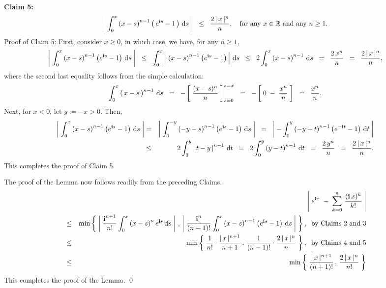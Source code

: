 \vskip 0.5cm
\noindent
\textbf{Claim 5:}
\begin{equation*}
\left\vert\;
\int_{0}^{x}\left(x-s\right)^{n-1}\left(\,e^{\textnormal{\bf i} s} - 1\,\right)\,\textnormal{d} s
\;\right\vert
\;\; \leq \;\; \dfrac{2\,\vert\,x\,\vert^{n}}{n},
\quad
\textnormal{for any $x \in \mathbb{R}$ and any $n \geq 1$.}
\end{equation*}
{\small Proof of Claim 5: First, consider $x \geq 0$, in which case, we have, for any $n \geq 1$,
\begin{equation*}
\left\vert\;
\int_{0}^{x}\left(x-s\right)^{n-1}\left(e^{\textnormal{\bf i} s} - 1\right)\,\textnormal{d} s
\;\right\vert
\;\;\leq\;\;
\int_{0}^{x}
\left\vert\;
\left(x-s\right)^{n-1}\left(e^{\textnormal{\bf i} s} - 1\right)
\,\right\vert
\,\textnormal{d} s
\;\;\leq\;\; 2 \int_{0}^{x}\left(x-s\right)^{n-1}\,\textnormal{d} s
\;\;=\;\; \dfrac{2\,x^{n}}{n}
\;\;=\;\; \dfrac{2\,\vert\,x\,\vert^{n}}{n},
\end{equation*}
where the second last equality follows from the simple calculation:
\begin{equation*}
\int_{0}^{x}\left(\,x-s\,\right)^{n-1}\,\textnormal{d} s
\;\;=\;\; - \left[\;\dfrac{(x-s)^{n}}{n}\;\right]_{s=0}^{s=x}
\;\;=\;\; - \left[\;0 \; - \; \dfrac{x^{n}}{n}\;\right]
\;\;=\;\; \dfrac{x^{n}}{n}.
\end{equation*}
Next, for $x < 0$, let $y:=-x > 0$. Then,
\begin{eqnarray*}
\left\vert\;
\int_{0}^{x}\left(x-s\right)^{n-1}\left(e^{\textnormal{\bf i} s} - 1\right)\,\textnormal{d} s
\;\right\vert
&=&
\left\vert\;
\int_{0}^{-y}\left(-y-s\right)^{n-1}\left(e^{\textnormal{\bf i} s} - 1\right)\,\textnormal{d} s
\;\right\vert
\;\;=\;\;
\left\vert\;
-\int_{0}^{y}\left(-y+t\right)^{n-1}\left(e^{-\textnormal{\bf i} t} - 1\right)\,\textnormal{d} t
\;\right\vert
\\
&\leq& 2\int_{0}^{y}\left\vert\,t-y\,\right\vert^{n-1}\,\textnormal{d} t
\;\;=\;\; 2 \int_{0}^{y}\left(y-t\right)^{n-1}\,\textnormal{d} t
\;\;=\;\; \dfrac{2\,y^{n}}{n}
\;\;=\;\; \dfrac{2\,\vert\,x\,\vert^{n}}{n}.
\end{eqnarray*}
This completes the proof of Claim 5.
}

\vskip 0.5cm
\noindent
The proof of the Lemma now follows readily from the preceding Claims.
\begin{eqnarray*}
&& \left\vert\;e^{\textnormal{\bf i} x} \;-\; \sum_{k = 0}^{n}\,\dfrac{(\textnormal{\bf i}\,x)^{k}}{k!} \;\right\vert
\\
&\leq&
\min\left\{\;
\left\vert\;\dfrac{\textnormal{\bf i}^{n+1}}{n!}\int_{0}^{x}\left(x-s\right)^{n}e^{\textnormal{\bf i} s}\,\textnormal{d} s\;\right\vert
\,,\,
\left\vert\;\dfrac{\textnormal{\bf i}^{n}}{(n-1)!}\int_{0}^{x}\left(x-s\right)^{n-1}\left(e^{\textnormal{\bf i} s}-1\right)\,\textnormal{d} s\;\right\vert
\;\right\},
\;\;\textnormal{by Claims 2 and 3}
\\
&\leq&
\min\left\{\;
\dfrac{1}{n!}\cdot\dfrac{\vert\,x\,\vert^{n+1}}{n+1}
\,,\,
\dfrac{1}{(n-1)!}\cdot\dfrac{2\,\vert\,x\,\vert^{n}}{n}
\;\right\},
\;\;\textnormal{by Claims 4 and 5}
\\
&\leq&
\min\left\{\;
\dfrac{\vert\,x\,\vert^{n+1}}{(n+1)!}
\,,\,
\dfrac{2\,\vert\,x\,\vert^{n}}{n!}
\;\right\}
\end{eqnarray*}
This completes the proof of the Lemma.
\qed

